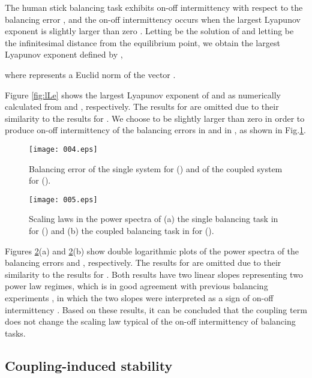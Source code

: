 \documentclass[12pt,a4paper]{ijicic}
\def\lfig#1{\label{fig:#1}}\def\rfig#1{Fig.\ref{fig:#1}}
\def\Rfig#1{Figure \ref{fig:#1}}
\begin{document}
The human stick balancing task exhibits on-off intermittency with
respect to the balancing error \cite{Cabrera02,Bormann04}, and the
on-off intermittency occurs when the largest Lyapunov exponent
 is slightly larger than zero \cite{Shankar96}.
Letting  be the solution of
  and letting  be the infinitesimal distance
 from the equilibrium point, we obtain the largest Lyapunov exponent
  defined by \cite{Shankar96},
 
 where  represents a Euclid norm of the vector
 .

\Rfig{lLe} shows the largest Lyapunov exponent  of  and
 as numerically calculated from  and
, respectively. The results for  are omitted due
to their similarity to the results for .  We choose
 to be slightly larger than zero in order to
produce on-off intermittency of the balancing errors  in
 and  in , as shown in \rfig{Be}.

\begin{figure}[t]
 \centering \texttt{[image: 004.eps]}
\caption{Balancing error  of the single system
  for  ()
 and  of the coupled system  for
  ().}
\lfig{Be}
\end{figure}

\begin{figure}[t]
 \centering
 \texttt{[image: 005.eps]}
\caption{Scaling laws in the power spectra of (a) the single balancing
 task in  for 
 () and (b) the coupled balancing task in 
 for  ().}
\lfig{pwsp}
\end{figure}

Figures \ref{fig:pwsp}(a) and \ref{fig:pwsp}(b) show double logarithmic
plots of the power spectra of the balancing errors  and ,
respectively. The results for  are omitted due to their
similarity to the results for .  Both results have two linear
slopes representing two power law regimes, which is in good agreement
with previous balancing experiments
\cite{Cabrera02,Cabrera04,Bormann04}, in which the two slopes were
interpreted as a sign of on-off intermittency \cite{Shankar96}.  Based
on these results, it can be concluded that the coupling term does not
change the scaling law typical of the on-off intermittency of balancing
tasks.


\subsection{Coupling-induced stability}
\end{document}
